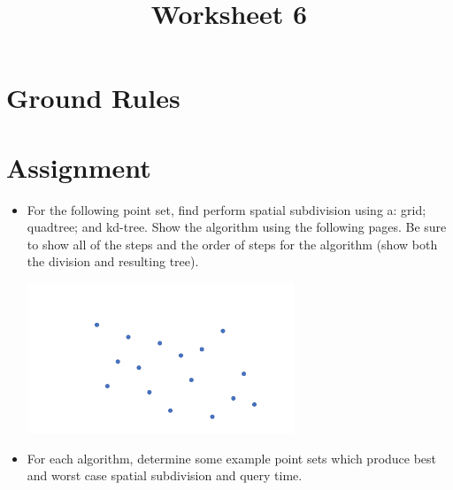 \documentclass[a4paper,12pt]{article}
\title{Worksheet 6}
\begin{document}
\maketitle


\vspace{5pt}
\section{Ground Rules}


\vspace{5pt}
\section{Assignment}

\begin{itemize}
\item For the following point set, find perform spatial subdivision using a: grid; quadtree; and kd-tree. Show the algorithm using the following pages. Be sure to show all of the steps and the order of steps for the algorithm (show both the division and resulting tree).

\begin{center}
\includegraphics[width=8cm]{../images/spatial_subd.pdf}
\end{center}


\item For each algorithm, determine some example point sets which produce best and worst case spatial subdivision and query time.


\end{itemize}



\end{document}
